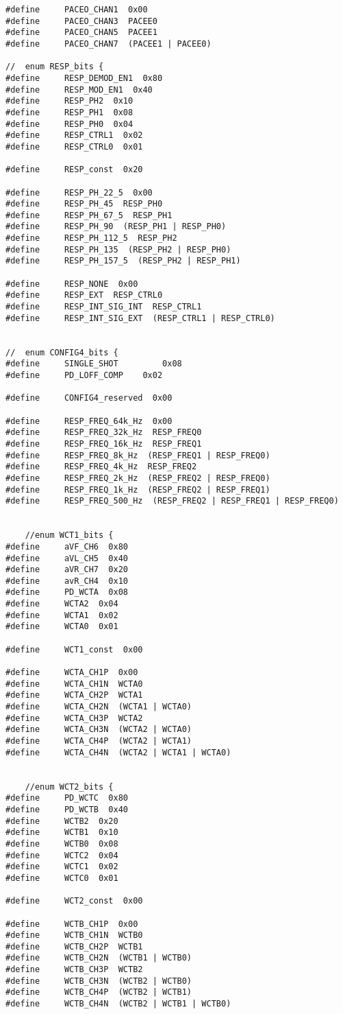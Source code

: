 \begin{lstlisting}[label=algoritmo:STM32F4:ADS1299.h,style = STM-code,frame=single,caption=STM32F4:ADS1299.h]
#define		PACEO_CHAN1  0x00
#define		PACEO_CHAN3  PACEE0
#define		PACEO_CHAN5  PACEE1
#define		PACEO_CHAN7  (PACEE1 | PACEE0)

//	enum RESP_bits {
#define		RESP_DEMOD_EN1  0x80
#define		RESP_MOD_EN1  0x40
#define		RESP_PH2  0x10
#define		RESP_PH1  0x08
#define		RESP_PH0  0x04
#define		RESP_CTRL1  0x02
#define		RESP_CTRL0  0x01

#define		RESP_const  0x20

#define		RESP_PH_22_5  0x00
#define		RESP_PH_45  RESP_PH0
#define		RESP_PH_67_5  RESP_PH1
#define		RESP_PH_90  (RESP_PH1 | RESP_PH0)
#define		RESP_PH_112_5  RESP_PH2
#define		RESP_PH_135  (RESP_PH2 | RESP_PH0)
#define		RESP_PH_157_5  (RESP_PH2 | RESP_PH1)

#define		RESP_NONE  0x00
#define		RESP_EXT  RESP_CTRL0
#define		RESP_INT_SIG_INT  RESP_CTRL1
#define		RESP_INT_SIG_EXT  (RESP_CTRL1 | RESP_CTRL0)


//	enum CONFIG4_bits {
#define		SINGLE_SHOT  		0x08
#define		PD_LOFF_COMP  	0x02

#define		CONFIG4_reserved  0x00

#define		RESP_FREQ_64k_Hz  0x00
#define		RESP_FREQ_32k_Hz  RESP_FREQ0
#define		RESP_FREQ_16k_Hz  RESP_FREQ1
#define		RESP_FREQ_8k_Hz  (RESP_FREQ1 | RESP_FREQ0)
#define		RESP_FREQ_4k_Hz  RESP_FREQ2
#define		RESP_FREQ_2k_Hz  (RESP_FREQ2 | RESP_FREQ0)
#define		RESP_FREQ_1k_Hz  (RESP_FREQ2 | RESP_FREQ1)
#define		RESP_FREQ_500_Hz  (RESP_FREQ2 | RESP_FREQ1 | RESP_FREQ0)


	//enum WCT1_bits {
#define		aVF_CH6  0x80
#define		aVL_CH5  0x40
#define		aVR_CH7  0x20
#define		avR_CH4  0x10
#define		PD_WCTA  0x08
#define		WCTA2  0x04
#define		WCTA1  0x02
#define		WCTA0  0x01

#define		WCT1_const  0x00

#define		WCTA_CH1P  0x00
#define		WCTA_CH1N  WCTA0
#define		WCTA_CH2P  WCTA1
#define		WCTA_CH2N  (WCTA1 | WCTA0)
#define		WCTA_CH3P  WCTA2
#define		WCTA_CH3N  (WCTA2 | WCTA0)
#define		WCTA_CH4P  (WCTA2 | WCTA1)
#define		WCTA_CH4N  (WCTA2 | WCTA1 | WCTA0)


	//enum WCT2_bits {
#define		PD_WCTC  0x80
#define		PD_WCTB  0x40
#define		WCTB2  0x20
#define		WCTB1  0x10
#define		WCTB0  0x08
#define		WCTC2  0x04
#define		WCTC1  0x02
#define		WCTC0  0x01

#define		WCT2_const  0x00

#define		WCTB_CH1P  0x00
#define		WCTB_CH1N  WCTB0
#define		WCTB_CH2P  WCTB1
#define		WCTB_CH2N  (WCTB1 | WCTB0)
#define		WCTB_CH3P  WCTB2
#define		WCTB_CH3N  (WCTB2 | WCTB0)
#define		WCTB_CH4P  (WCTB2 | WCTB1)
#define		WCTB_CH4N  (WCTB2 | WCTB1 | WCTB0)


\end{lstlisting}
